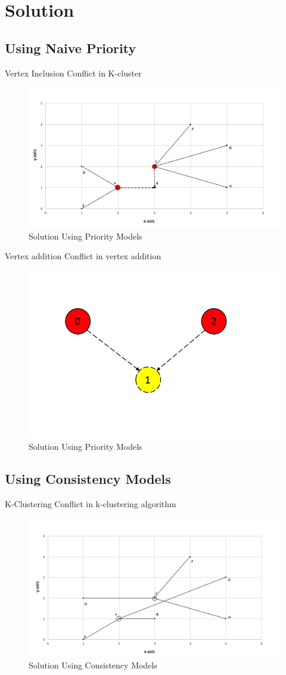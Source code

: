 \section{Solution}
\subsection{Using Naive Priority}
\begin{frame}{Vertex Inclusion}
	Conflict in K-cluster
			\begin{figure}
			\includegraphics[width=0.6\linewidth]{figures/priority2.png}
			\caption{Solution Using Priority Models}
			\end{figure}
\end{frame}

\begin{frame}{Vertex addition}
	Conflict in vertex addition
			\begin{figure}
			\includegraphics[width=0.6\linewidth]{figures/priority1.png}
			\caption{Solution Using Priority Models}
			\end{figure}
\end{frame}

\subsection{Using Consistency Models}
\begin{frame}{K-Clustering}
	Conflict in k-clustering algorithm
			\begin{figure}
			\includegraphics[width=0.8\linewidth]{figures/kcluster1.jpg}
			\caption{Solution Using Consistency Models}
			\end{figure}
\end{frame}

